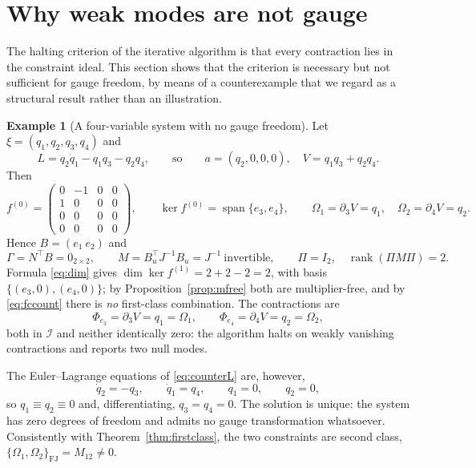 \documentclass[12pt]{article}
\theoremstyle{plain}
\theoremstyle{definition}
\newtheorem{example}[theorem]{Example}
\theoremstyle{remark}
\DeclareMathOperator{\rank}{rank}
\DeclareMathOperator{\spn}{span}
\newcommand{\pd}[1]{\partial_{#1}}
\newcommand{\Om}{\Omega}
\newcommand{\Ical}{\mathcal{I}}
\newcommand{\FJ}{\mathrm{FJ}}
\begin{document}
	\section{Why weak modes are not gauge}
	\label{sec:weak}
	
	The halting criterion of the iterative algorithm is that every contraction lies
	in the constraint ideal. This section shows that the criterion is necessary but
	not sufficient for gauge freedom, by means of a counterexample that we regard as
	a structural result rather than an illustration.
	
	\begin{example}[A four-variable system with no gauge freedom]
		\label{ex:counter}
		Let $\xi=(q_{1},q_{2},q_{3},q_{4})$ and
		\begin{equation}
			L=q_{2}\dot q_{1}-q_{1}q_{3}-q_{2}q_{4},
			\qquad\text{so}\qquad
			a=(q_{2},0,0,0),\quad V=q_{1}q_{3}+q_{2}q_{4}.
			\label{eq:counterL}
		\end{equation}
		Then
		\[
		f^{(0)}=\begin{pmatrix}0&-1&0&0\\1&0&0&0\\0&0&0&0\\0&0&0&0\end{pmatrix},
		\qquad
		\ker f^{(0)}=\spn\{e_{3},e_{4}\},
		\qquad
		\Om_{1}=\pd{3}V=q_{1},\quad\Om_{2}=\pd{4}V=q_{2}.
		\]
		Hence $B=(e_{1}\ e_{2})$ and
		\[
		\Gamma=N^{\top}B=0_{2\times2},
		\qquad
		M=B_{u}^{\top}J^{-1}B_{u}=J^{-1}\ \text{invertible},
		\qquad
		\Pi=I_{2},\quad\rank(\Pi M\Pi)=2 .
		\]
		Formula \eqref{eq:dim} gives $\dim\ker f^{(1)}=2+2-2=2$, with basis
		$\{(e_{3},0),(e_{4},0)\}$; by Proposition~\ref{prop:mfree} both are
		multiplier-free, and by \eqref{eq:fccount} there is \emph{no} first-class
		combination. The contractions are
		\[
		\Phi_{e_{3}}=\pd{3}V=q_{1}=\Om_{1},
		\qquad
		\Phi_{e_{4}}=\pd{4}V=q_{2}=\Om_{2},
		\]
		both in $\Ical$ and neither identically zero: the algorithm halts on weakly
		vanishing contractions and reports two null modes.
		
		The Euler--Lagrange equations of \eqref{eq:counterL} are, however,
		\[
		\dot q_{2}=-q_{3},\qquad
		\dot q_{1}=q_{4},\qquad
		q_{1}=0,\qquad
		q_{2}=0,
		\]
		so $q_{1}\equiv q_{2}\equiv0$ and, differentiating, $q_{3}=q_{4}=0$. The
		solution is unique: the system has zero degrees of freedom and admits no gauge
		transformation whatsoever. Consistently with Theorem~\ref{thm:firstclass}, the
		two constraints are second class, $\{\Om_{1},\Om_{2}\}_{\FJ}=M_{12}\neq0$.
	\end{example}
	
\end{document}
